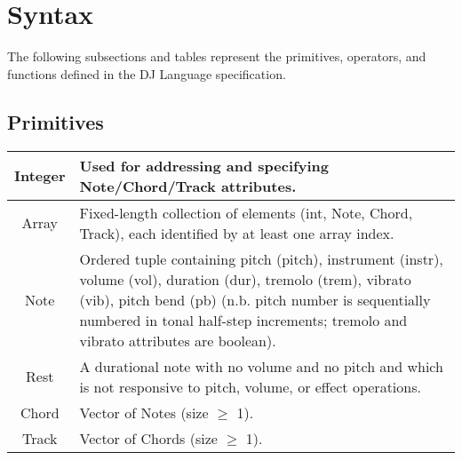 \documentclass[letterpaper]{article}
\begin{document}
\section{Syntax}

The following subsections and tables represent the primitives, operators, and functions defined in the DJ Language specification.

\begin{samepage}
\subsection{Primitives}
\begin{table}[H]
\centering
\begin{tabularx}{.75\textwidth}{|c|X|}
\hline
Integer & Used for addressing and specifying Note/Chord/Track attributes. \\
\hline
Array & Fixed-length collection of elements (int, Note, Chord, Track), each identified by at least one array index. \\
\hline
Note & Ordered tuple containing pitch (pitch), instrument (instr), volume (vol), duration (dur), tremolo (trem), vibrato (vib), pitch bend (pb) (n.b. pitch number is sequentially numbered in tonal half-step increments; tremolo and vibrato attributes are boolean). \\
\hline
Rest & A durational note with no volume and no pitch and which is not responsive to pitch, volume, or effect operations. \\
\hline
Chord & Vector of Notes (size $\geq$ 1). \\
\hline
Track & Vector of Chords (size $\geq$ 1). \\
\hline
\end{tabularx}
\end{table}
\end{samepage}
\end{document}
